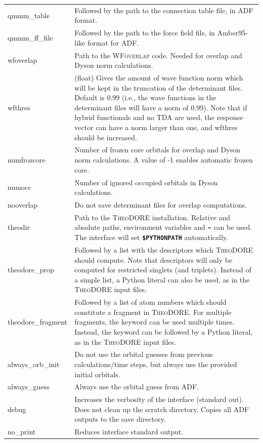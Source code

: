 \documentclass[a4paper,10pt,DIV=15,openany]{scrbook}
\newcommand{\ttt}[1]{\textbf{\texttt{#1}}}
\begin{document}
\begin{table}
\begin{tabular}{>{\ttfamily}lp{12cm}}
\\
qmmm\_table             &Followed by the path to the connection table file, in ADF format.
\\
qmmm\_ff\_file          &Followed by the path to the force field file, in Amber95-like format for ADF.
\\
wfoverlap               &Path to the \textsc{WFoverlap} code. Needed for overlap and Dyson norm calculations.
\\
wfthres                 &(float) Gives the amount of wave function norm which will be kept in the truncation of the determinant files. Default is 0.99 (i.e., the wave functions in the determinant files will have a norm of 0.99). Note that if hybrid functionals and no TDA are used, the response vector can have a norm larger than one, and wfthres should be increased.
\\
numfrozcore             &Number of frozen core orbitals for overlap and Dyson norm calculations. A value of -1 enables automatic frozen core.
\\
numocc                  &Number of ignored occupied orbitals in Dyson calculations.
\\
nooverlap               &Do not save determinant files for overlap computations.
\\
theodir                 &Path to the \textsc{TheoDORE} installation. Relative and absolute paths, environment variables and \ttt{\textasciitilde} can be used. The interface will set \ttt{\$PYTHONPATH} automatically.
\\
theodore\_prop          &Followed by a list with the descriptors which \textsc{TheoDORE} should compute. Note that descriptors will only be computed for restricted singlets (and triplets). Instead of a simple list, a Python literal can also be used, as in the \textsc{TheoDORE} input files.
\\
theodore\_fragment      &Followed by a list of atom numbers which should constitute a fragment in \textsc{TheoDORE}. For multiple fragments, the keyword can be used multiple times. Instead, the keyword can be followed by a Python literal, as in the \textsc{TheoDORE} input files.
\\
always\_orb\_init       &Do not use the orbital guesses from previous calculations/time steps, but always use the provided initial orbitals.
\\
always\_guess           &Always use the orbital guess from ADF.
\\
  debug                 &Increases the verbosity of the interface (standard out). Does not clean up the scratch directory. Copies all ADF outputs to the save directory.
\\
  no\_print             &Reduces interface standard output.
\\
  \hline
  \end{tabular}
\end{table}
\end{document}
